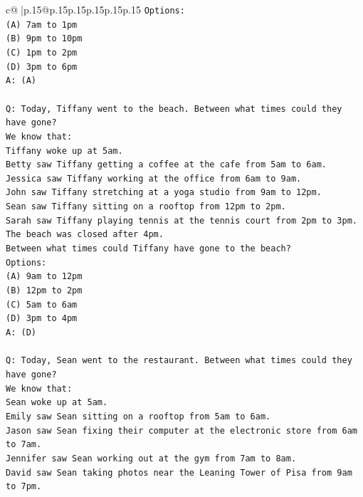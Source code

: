 \documentclass{article}
\begin{document}
{\begin{supertabular}{c@{$\;$}|p{.15\linewidth}@{}p{.15\linewidth}p{.15\linewidth}p{.15\linewidth}p{.15\linewidth}p{.15\linewidth}}
{{{\texttt{Options:} \\
\texttt{(A) 7am to 1pm} \\
\texttt{(B) 9pm to 10pm} \\
\texttt{(C) 1pm to 2pm} \\
\texttt{(D) 3pm to 6pm} \\
\texttt{A: (A)} \\
\\ 
\texttt{Q: Today, Tiffany went to the beach. Between what times could they have gone?} \\
\texttt{We know that:} \\
\texttt{Tiffany woke up at 5am.} \\
\texttt{Betty saw Tiffany getting a coffee at the cafe from 5am to 6am.} \\
\texttt{Jessica saw Tiffany working at the office from 6am to 9am.} \\
\texttt{John saw Tiffany stretching at a yoga studio from 9am to 12pm.} \\
\texttt{Sean saw Tiffany sitting on a rooftop from 12pm to 2pm.} \\
\texttt{Sarah saw Tiffany playing tennis at the tennis court from 2pm to 3pm.} \\
\texttt{The beach was closed after 4pm.} \\
\texttt{Between what times could Tiffany have gone to the beach?} \\
\texttt{Options:} \\
\texttt{(A) 9am to 12pm} \\
\texttt{(B) 12pm to 2pm} \\
\texttt{(C) 5am to 6am} \\
\texttt{(D) 3pm to 4pm} \\
\texttt{A: (D)} \\
\\ 
\texttt{Q: Today, Sean went to the restaurant. Between what times could they have gone?} \\
\texttt{We know that:} \\
\texttt{Sean woke up at 5am.} \\
\texttt{Emily saw Sean sitting on a rooftop from 5am to 6am.} \\
\texttt{Jason saw Sean fixing their computer at the electronic store from 6am to 7am.} \\
\texttt{Jennifer saw Sean working out at the gym from 7am to 8am.} \\
\texttt{David saw Sean taking photos near the Leaning Tower of Pisa from 9am to 7pm.} \\
}}}
\end{supertabular}}
\end{document}
